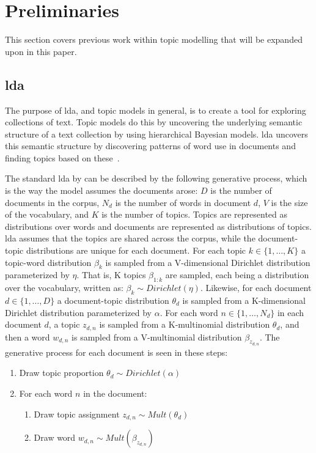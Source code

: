 \section{Preliminaries}\label{sec:preliminaries}
This section covers previous work within topic modelling that will be expanded upon in this paper.

\subsection{\acrlong{lda}}
The purpose of \gls{lda}, and topic models in general, is to create a tool for exploring collections of text.
Topic models do this by uncovering the underlying semantic structure of a text collection by using hierarchical Bayesian models.
\Gls{lda} uncovers this semantic structure by discovering patterns of word use in documents and finding topics based on these~\cite{blei2009topic}.

The standard \gls{lda} by \citet{blei2003latent} can be described by the following generative process, which is the way the model assumes the documents arose:
$D$ is the number of documents in the corpus, $N_d$ is the number of words in document $d$, $V$ is the size of the vocabulary, and $K$ is the number of topics.
Topics are represented as distributions over words and documents are represented as distributions of topics.
\Gls{lda} assumes that the topics are shared across the corpus, while the document-topic distributions are unique for each document.
For each topic $k \in \{1,\dots, K\}$ a topic-word distribution $\beta_k$ is sampled from a V-dimensional Dirichlet distribution parameterized by $\eta$.
That is, K topics $\beta_{1:k}$ are sampled, each being a distribution over the vocabulary, written as: $\beta_k \sim Dirichlet(\eta)$.
Likewise, for each document $d \in \{1,\dots, D\}$ a document-topic distribution $\theta_d$ is sampled from a K-dimensional Dirichlet distribution parameterized by $\alpha$.
For each word $n \in \{1, \dots, N_d\}$ in each document $d$, a topic $z_{d,n}$ is sampled from a K-multinomial distribution $\theta_d$, and then a word $w_{d,n}$ is sampled from a V-multinomial distribution $\beta_{z_{d,n}}$.
The generative process for each document is seen in these steps:

\vspace{\topsep}
\begin{enumerate}
	\item Draw topic proportion $\theta_d \sim Dirichlet(\alpha)$
	\item For each word $n$ in the document:
	\begin{enumerate}
		\item Draw topic assignment $z_{d,n} \sim Mult(\theta_d)$
		\item Draw word $w_{d,n} \sim Mult(\beta_{z_{d,n}})$
	\end{enumerate}
\end{enumerate}
\vspace{\topsep}

